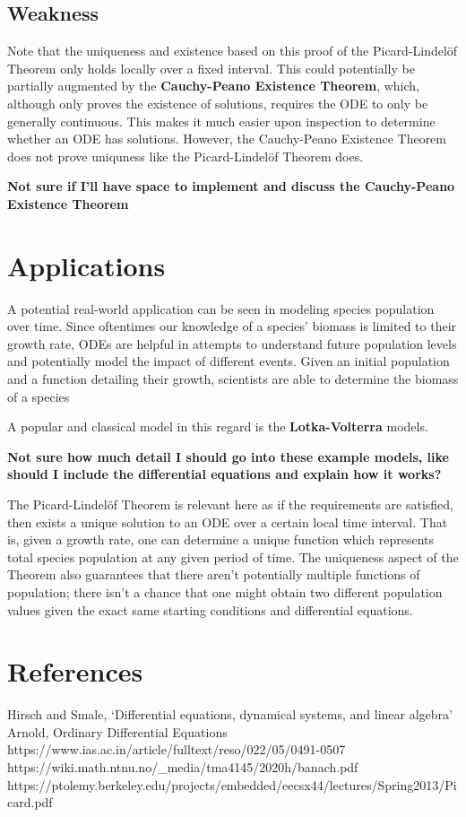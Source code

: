 \documentclass{article}
\theoremstyle{remark}
\begin{document}
\subsection{Weakness} Note that the uniqueness and existence based on this proof of the Picard-Lindelöf Theorem only holds locally over a fixed interval. This could potentially be partially augmented by the \textbf{Cauchy-Peano Existence Theorem}, which, although only proves the existence of solutions, requires the ODE to only be generally continuous. This makes it much easier upon inspection to determine whether an ODE has solutions. However, the Cauchy-Peano Existence Theorem does not prove uniquness like the Picard-Lindelöf Theorem does.


\textbf{Not sure if I'll have space to implement and discuss the Cauchy-Peano Existence Theorem}

\section{Applications}
A potential real-world application can be seen in modeling species population over time. Since oftentimes our knowledge of a species' biomass is limited to their growth rate, ODEs are helpful in attempts to understand future population levels and potentially model the impact of different events. Given an initial population and a function detailing their growth, scientists are able to determine the biomass of a species

A popular and classical model in this regard is the \textbf{Lotka-Volterra} models.

\textbf{Not sure how much detail I should go into these example models, like should I include the differential equations and explain how it works?}

The Picard-Lindelöf Theorem is relevant here as if the requirements are satisfied, then exists a unique solution to an ODE over a certain local time interval. That is, given a growth rate, one can determine a unique function which represents total species population at any given period of time. The uniqueness aspect of the Theorem also guarantees that there aren't potentially multiple functions of population; there isn't a chance that one might obtain two different population values given the exact same starting conditions and differential equations.

\section{References}
Hirsch and Smale, ‘Differential equations, dynamical systems, and linear algebra’ \\ 
Arnold, Ordinary Differential Equations \\ 
https://www.ias.ac.in/article/fulltext/reso/022/05/0491-0507 \\ 
https://wiki.math.ntnu.no/\_media/tma4145/2020h/banach.pdf \\ 
https://ptolemy.berkeley.edu/projects/embedded/eecsx44/lectures/Spring2013/Picard.pdf\\
\end{document}
